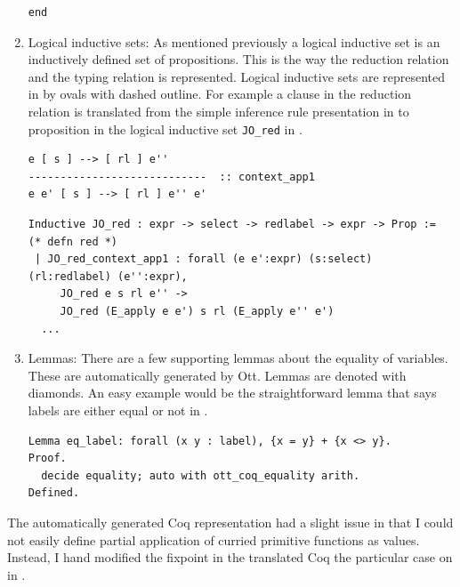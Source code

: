 \documentclass[12pt,twoside,notitlepage]{report}
\begin{document}
\begin{enumerate}
{\begin{minipage}{\linewidth}
\begin{lstlisting}[language={Coq},caption={Coq expression substitution}, label={lst:coqexprsubst}]
end
\end{lstlisting}
\end{minipage}	
}
\item{Logical inductive sets: As mentioned previously a logical inductive set is an inductively defined set of propositions. This is the way the reduction relation and the typing relation is represented. Logical inductive sets are represented in  by ovals with dashed outline. For example a clause in the reduction relation is translated from the simple inference rule presentation in  to proposition in the logical inductive set \verb|JO_red| in .

\begin{lstlisting}[language={Ott}, caption={Ott reduction relation example}, label={lst:ottcontextapp1}]
e [ s ] --> [ rl ] e''
----------------------------  :: context_app1
e e' [ s ] --> [ rl ] e'' e'
\end{lstlisting}

\begin{minipage}{\linewidth}
\begin{lstlisting}[language={Coq},caption={Coq reduction relation example}, label={lst:coqlogind}]
Inductive JO_red : expr -> select -> redlabel -> expr -> Prop :=    (* defn red *)
 | JO_red_context_app1 : forall (e e':expr) (s:select) (rl:redlabel) (e'':expr),
     JO_red e s rl e'' ->
     JO_red (E_apply e e') s rl (E_apply e'' e')
  ...
\end{lstlisting}
\end{minipage}	
}
\item{Lemmas: There are a few supporting lemmas about the equality of variables. These are automatically generated by Ott. Lemmas are denoted with diamonds. An easy example would be the straightforward lemma that says labels are either equal or not in .

\begin{minipage}{\linewidth}
\begin{lstlisting}[language={Coq},caption={Coq label equality lemma}, label={lst:coqeqlabel}]
Lemma eq_label: forall (x y : label), {x = y} + {x <> y}.
Proof.
  decide equality; auto with ott_coq_equality arith.
Defined.
\end{lstlisting}
\end{minipage}	

}
\end{enumerate} 
The automatically generated Coq representation had a slight issue in that I could not easily define partial application of curried primitive functions as values. Instead, I hand modified the fixpoint in the translated Coq the particular case on  in .
\end{document}
